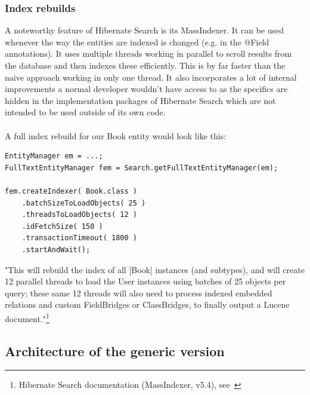 \pagebreak

\subsubsection{Index rebuilds}
A noteworthy feature of Hibernate Search is its MassIndexer. It can be used whenever the way the entities are indexed is changed (e.g. in the @Field annotations). It uses multiple threads working in parallel to scroll results from the database and then indexes these efficiently. This is by far faster than the naive approach working in only one thread. It also incorporates a lot of internal improvements a normal developer wouldn't have access to as the specifics are hidden in the implementation packages of Hibernate Search which are not intended to be used outside of its own code.
\\\\
A full index rebuild for our Book entity would look like this:
\\
\lstset{language=java}
\begin{lstlisting}[frame=htrbl, caption={MassIndexer usage with Hibernate Search ORM}, label={lst:massindexing_hsearch_orm.java}]
EntityManager em = ...;
FullTextEntityManager fem = Search.getFullTextEntityManager(em);

fem.createIndexer( Book.class )
	.batchSizeToLoadObjects( 25 )
	.threadsToLoadObjects( 12 )
	.idFetchSize( 150 )
	.transactionTimeout( 1800 )
	.startAndWait();
\end{lstlisting}
\noindent
"This will rebuild the index of all [Book] instances (and subtypes), and will create 12 parallel threads to load the User instances using batches of 25 objects per query; these same 12 threads will also need to process indexed embedded relations and custom FieldBridges or ClassBridges, to finally output a Lucene document."\footnote{Hibernate Search documentation (MassIndexer, v5.4), see~\cite{hibernate_search_doc_massindexer}}

\pagebreak

\subsection{Architecture of the generic version}

